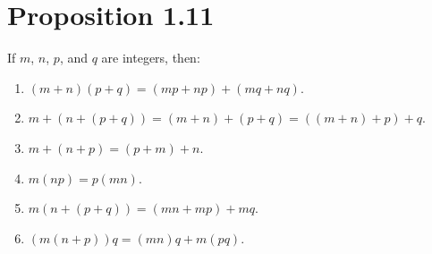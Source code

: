 \section*{Proposition 1.11}
If $m$, $n$, $p$, and $q$ are integers, then:
\begin{enumerate}[label=(\roman*)]
    \item $(m+n)(p+q) = (mp+np)+(mq+nq)$.
    \item $m+(n+(p+q)) = (m+n)+(p+q) = ((m+n)+ p)+q$.
    \item $m+(n+ p) = (p+m)+n$.
    \item $m(np) = p(mn)$.
    \item $m(n+(p+q)) = (mn+mp)+mq$.
    \item $(m(n+ p))q = (mn)q+m(pq)$.
\end{enumerate}

